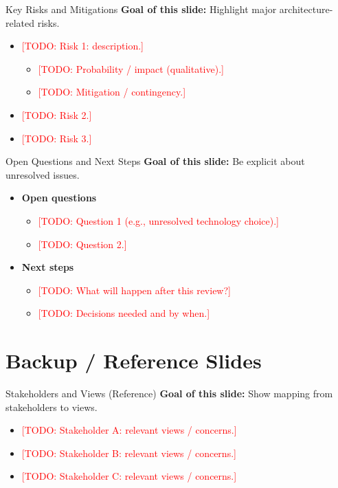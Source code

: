 \documentclass[aspectratio=169]{beamer}
\newcommand{\TODO}[1]{\textcolor{red}{[TODO: #1]}}
\begin{document}
\begin{frame}{Key Risks and Mitigations}
  \textbf{Goal of this slide:} Highlight major architecture-related risks.

  \begin{itemize}
    \item \TODO{Risk 1: description.}
      \begin{itemize}
        \item \TODO{Probability / impact (qualitative).}
        \item \TODO{Mitigation / contingency.}
      \end{itemize}
    \item \TODO{Risk 2.}
    \item \TODO{Risk 3.}
  \end{itemize}
\end{frame}

\begin{frame}{Open Questions and Next Steps}
  \textbf{Goal of this slide:} Be explicit about unresolved issues.

  \begin{itemize}
    \item \textbf{Open questions}
      \begin{itemize}
        \item \TODO{Question 1 (e.g., unresolved technology choice).}
        \item \TODO{Question 2.}
      \end{itemize}
    \item \textbf{Next steps}
      \begin{itemize}
        \item \TODO{What will happen after this review?}
        \item \TODO{Decisions needed and by when.}
      \end{itemize}
  \end{itemize}
\end{frame}

\section{Backup / Reference Slides}

\begin{frame}{Stakeholders and Views (Reference)}
  \textbf{Goal of this slide:} Show mapping from stakeholders to views.

  \begin{itemize}
    \item \TODO{Stakeholder A: relevant views / concerns.}
    \item \TODO{Stakeholder B: relevant views / concerns.}
    \item \TODO{Stakeholder C: relevant views / concerns.}
  \end{itemize}
\end{frame}
\end{document}
